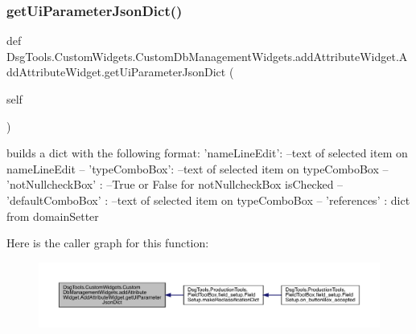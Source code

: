 \subsubsection{\texorpdfstring{get\+Ui\+Parameter\+Json\+Dict()}{getUiParameterJsonDict()}}
{\footnotesize\ttfamily def Dsg\+Tools.\+Custom\+Widgets.\+Custom\+Db\+Management\+Widgets.\+add\+Attribute\+Widget.\+Add\+Attribute\+Widget.\+get\+Ui\+Parameter\+Json\+Dict (\begin{DoxyParamCaption}\item[{}]{self }\end{DoxyParamCaption})}

\begin{DoxyVerb}builds a dict with the following format:
{
    'nameLineEdit': --text of selected item on nameLineEdit --
    'typeComboBox': --text of selected item on typeComboBox --
    'notNullcheckBox' : --True or False for notNullcheckBox isChecked --
    'defaultComboBox' : --text of selected item on typeComboBox --
    'references' : dict from domainSetter
}
\end{DoxyVerb}
 Here is the caller graph for this function\+:
\nopagebreak
\begin{figure}[H]
\begin{center}
\leavevmode
\includegraphics[width=350pt]{class_dsg_tools_1_1_custom_widgets_1_1_custom_db_management_widgets_1_1add_attribute_widget_1_1_add_attribute_widget_a3956b3e0edc47bbab3bf542356c42fa7_icgraph}
\end{center}
\end{figure}
\mbox{\label{class_dsg_tools_1_1_custom_widgets_1_1_custom_db_management_widgets_1_1add_attribute_widget_1_1_add_attribute_widget_a878e493b127050a4241892d85d437e9e}} 
